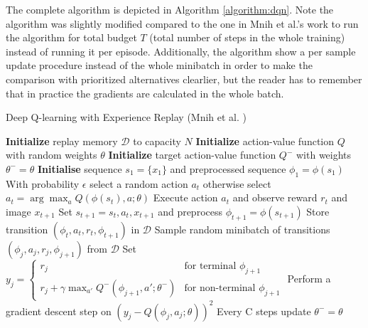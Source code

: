 The complete algorithm is depicted in Algorithm \ref{algorithm:dqn}. Note the algorithm was slightly modified compared to the one in Mnih et al.'s work \cite{mnih2013playing, mnih2015human} to run the algorithm for total budget $T$ (total number of steps in the whole training) instead of running it per episode. Additionally, the algorithm show a per sample update procedure instead of the whole minibatch in order to make the comparison with prioritized alternatives clearlier, but the reader has to remember that in practice the gradients are calculated in the whole batch.

\begin{algorithm}
\caption{Deep Q-learning with Experience Replay (Mnih et al. \cite{mnih2013playing, mnih2015human})}
\label{algorithm:dqn}
\begin{algorithmic}[1]
\State \textbf{Initialize} replay memory $\mathcal{D}$ to capacity $N$
\State \textbf{Initialize} action-value function $Q$ with random weights $\theta$
\State \textbf{Initialize} target action-value function $Q^-$ with weights $\theta^- = \theta$
    \State \textbf{Initialise} sequence $s_1 = \{x_1\}$ and preprocessed sequence $\phi_1 = \phi(s_1)$
        \State With probability $\epsilon$ select a random action $a_t$
        \State otherwise select $a_t = \arg\max_a Q(\phi(s_t), a; \theta)$
        \State Execute action $a_t$ and observe reward $r_t$ and image $x_{t+1}$
        \State Set $s_{t+1} = s_t, a_t, x_{t+1}$ and preprocess $\phi_{t+1} = \phi(s_{t+1})$
        \State Store transition $(\phi_t, a_t, r_t, \phi_{t+1})$ in $\mathcal{D}$
        \State Sample random minibatch of transitions $(\phi_j, a_j, r_j, \phi_{j+1})$ from $\mathcal{D}$
        \State Set $y_j = 
        \begin{cases} 
            r_j & \text{for terminal } \phi_{j+1}\\
            r_j + \gamma \max_{a'} Q^-(\phi_{j+1}, a'; \theta^-) & \text{for non-terminal } \phi_{j+1}
        \end{cases}$
        \State Perform a gradient descent step on $(y_j - Q(\phi_j, a_j; \theta))^2$
        \State Every C steps update $\theta^- = \theta$
    \EndFor
\EndFor
\end{algorithmic}
\end{algorithm}


